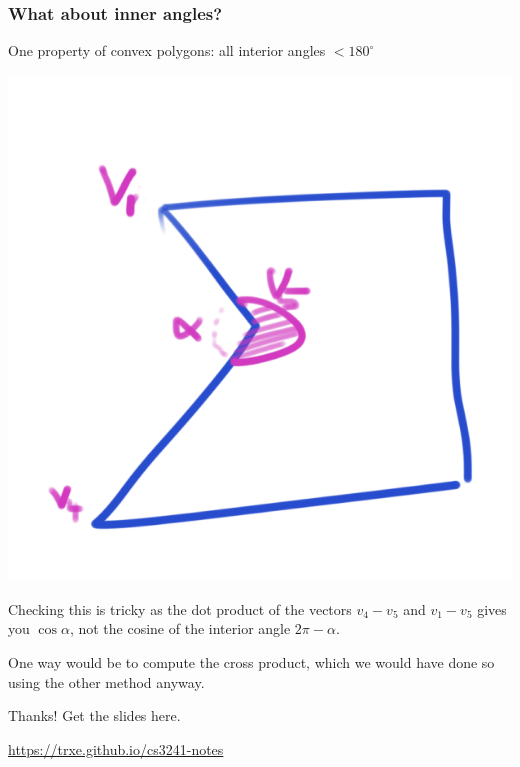 \documentclass{beamer}
\begin{document}
\begin{frame}
    \frametitle{What about inner angles?}

    One property of convex polygons: all interior angles $<180^{\circ}$

    \vspace{1em}

    \begin{center}
        \includegraphics[scale=0.4]{dot-prod.png}
    \end{center}

    Checking this is tricky as the dot product of the vectors $v_4- v_5$ and $v_1 - v_5$ gives you $\cos\alpha$, 
    not the cosine of the interior angle $2\pi - \alpha$.

    One way would be to compute the cross product, which we would have done so using the other method anyway.

\end{frame}


\ThankYou
\begin{frame}
    Thanks! Get the slides here.\\
    \vspace{2em}
    \scalebox{3}{\faGithub}\par\bigskip
    \url{https://trxe.github.io/cs3241-notes}
\end{frame}
\end{document}
